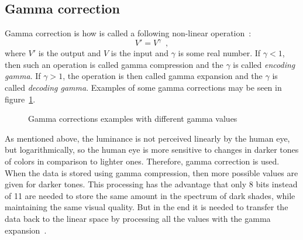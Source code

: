 \documentclass[thesis=B,english]{FITthesis}[2019/12/23]
\begin{document}
        \subsection{Gamma correction}
            Gamma correction is how is called a following non-linear operation~\cite{McHughc20052020}:
            \begin{equation}
                            V' = V^{\gamma} \enspace ,
            \end{equation}\label{eq:gamma}
            where \(V'\) is the output and \(V\) is the input and \(\gamma\) is some real number. If \(\gamma < 1\), then such an operation is called gamma compression and the \(\gamma\) is called  \emph{encoding gamma}. If \(\gamma > 1\), the operation is then called gamma expansion and the \(\gamma\) is called  \emph{decoding gamma}. Examples of some gamma corrections may be seen in figure~\ref{fig:gamaKorekce}.

            \begin{figure}
                \centering
                \caption{Gamma corrections examples with different gamma values}
                \label{fig:gamaKorekce}
            \end{figure}
            
            As mentioned above, the luminance is not perceived linearly by the human eye, but logarithmically, so the human eye is more sensitive to changes in darker tones of colors in comparison to lighter ones. Therefore, gamma correction is used. When the data is stored using gamma compression, then more possible values are given for darker tones. This processing has the advantage that only 8 bits instead of 11 are needed to store the same amount in the spectrum of dark shades, while maintaining the same visual quality. But in the end it is needed to transfer the data back to the linear space by processing all the values with the gamma expansion~\cite{McHughc20052020}.
            
\end{document}
